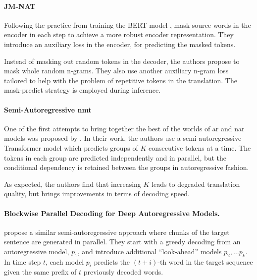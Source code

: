 \paragraph{JM-NAT} %
Following the practice from training the BERT model
\citep{devlin-etal-2019-bert}, \citet{guo-etal-2020-jointly} mask source words
in the encoder in each step to achieve a more robust encoder
representation. They introduce an auxiliary loss in the encoder, for predicting
the masked tokens.

Instead of masking out random tokens in the decoder, the authors propose to
mask whole random n-grams. They also use another auxiliary n-gram loss tailored
to help with the problem of repetitive tokens in the translation. The
mask-predict strategy \citep{ghazvininejad-etal-2019-mask} is employed during
inference.

\paragraph{Semi-Autoregressive \acs{nmt}} One of the first attempts to bring
together the best of the worlds of \ac{ar} and \ac{nar} models was proposed by
\citet{wang-etal-2018-semi}. In their work, the authors use a
semi-autoregressive Transformer model which predicts groups of $K$ consecutive
tokens at a time. The tokens in each group are predicted independently and in
parallel, but the conditional dependency is retained between the groups in
autoregressive fashion.

As expected, the authors find that increasing $K$ leads to degraded translation
quality, but brings improvements in terms of decoding speed.

\paragraph{Blockwise Parallel Decoding for Deep Autoregressive Models.}
\citet{stern2018blockwise} propose a similar semi-autoregressive approach where
chunks of the target sentence are generated in parallel.
%
They start with a greedy decoding from an autoregressive model, $p_1$, and
introduce additional ``look-ahead'' models $p_2, \ldots p_k$. In time step $t$,
each model $p_i$ predicts the $(t + i)$-th word in the target sequence given the
same prefix of $t$ previously decoded words.

